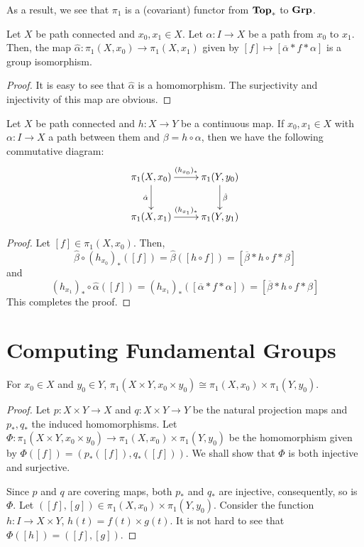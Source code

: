 As a result, we see that $\pi_1$ is a (covariant) functor from $\mathbf{Top}_*$ to $\mathbf{Grp}$.

\begin{theorem}
    Let $X$ be path connected and $x_0,x_1\in X$. Let $\alpha: I\to X$ be a path from $x_0$ to $x_1$. Then, the map $\hat\alpha:\pi_1(X,x_0)\to\pi_1(X,x_1)$ given by $[f]\mapsto[\overline\alpha*f*\alpha]$ is a group isomorphism.
\end{theorem}
\begin{proof}
    It is easy to see that $\hat\alpha$ is a homomorphism. The surjectivity and injectivity of this map are obvious.
\end{proof}

\begin{proposition}
    Let $X$ be path connected and $h: X\to Y$ be a continuous map. If $x_0,x_1\in X$ with $\alpha: I\to X$ a path between them and $\beta = h\circ\alpha$, then we have the following commutative diagram: 
    \begin{equation*}
    \xymatrix {
        \pi_1(X,x_0)\ar[r]^-{(h_{x_0})_*}\ar[d]_{\hat\alpha} & \pi_1(Y,y_0)\ar[d]^{\hat\beta}\\
        \pi_1(X,x_1)\ar[r]^-{(h_{x_1})_*} & \pi_1(Y,y_1)
    }
    \end{equation*}
\end{proposition}
\begin{proof}
    Let $[f]\in\pi_1(X,x_0)$. Then, 
    \begin{equation*}
        \hat\beta\circ(h_{x_0})_*([f]) = \hat\beta([h\circ f]) = [\overline\beta * h\circ f * \beta]
    \end{equation*}
    and 
    \begin{equation*}
        (h_{x_1})_*\circ\hat\alpha([f]) = (h_{x_1})_*([\overline\alpha * f * \alpha]) = [\overline\beta * h\circ f * \beta]
    \end{equation*}
    This completes the proof.
\end{proof}

\section{Computing Fundamental Groups}

\begin{theorem}
    For $x_0\in X$ and $y_0\in Y$, $\pi_1(X\times Y,  x_0\times y_0)\cong\pi_1(X,x_0)\times\pi_1(Y,y_0)$.
\end{theorem}
\begin{proof}
    Let $p: X\times Y\to X$ and $q: X\times Y\to Y$ be the natural projection maps and $p_*,q_*$ the induced homomorphisms. Let $\Phi:\pi_1(X\times Y,x_0\times y_0)\to\pi_1(X,x_0)\times\pi_1(Y,y_0)$ be the homomorphism given by $\Phi([f]) = (p_*([f]), q_*([f]))$. We shall show that $\Phi$ is both injective and surjective.

    Since $p$ and $q$ are covering maps, both $p_*$ and $q_*$ are injective, consequently, so is $\Phi$. Let $([f],[g])\in\pi_1(X,x_0)\times\pi_1(Y,y_0)$. Consider the function $h: I\to X\times Y$, $h(t) = f(t)\times g(t)$. It is not hard to see that $\Phi([h]) = ([f],[g])$.
\end{proof}

